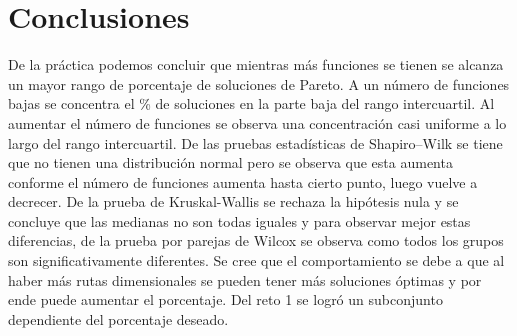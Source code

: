 \documentclass{article}
\begin{document}
\section{Conclusiones}
De la práctica podemos concluir que mientras más funciones se tienen se alcanza un mayor rango de porcentaje de soluciones de Pareto. A un número de funciones bajas se concentra el \% de soluciones en la parte baja del rango intercuartil. Al aumentar el número de funciones se observa una concentración casi uniforme a lo largo del rango intercuartil. De las pruebas estadísticas de Shapiro–Wilk se tiene que no tienen una distribución normal pero se observa que esta aumenta conforme el número de funciones aumenta hasta cierto punto, luego vuelve a decrecer. De la prueba de Kruskal-Wallis se rechaza la hipótesis nula y se concluye que las medianas no son todas iguales y para observar mejor estas diferencias, de la prueba por parejas de Wilcox se observa como todos los grupos son significativamente diferentes. Se cree que el comportamiento se debe a que al haber más rutas dimensionales se pueden tener más soluciones óptimas y por ende puede aumentar el porcentaje. Del reto 1 se logró un subconjunto dependiente del porcentaje deseado.



\end{document}
